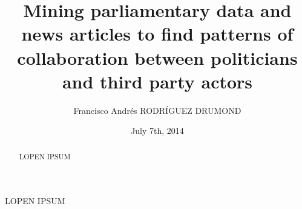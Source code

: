 \documentclass{report-DMKM}
\title{Mining parliamentary data and news articles \newline to find patterns of collaboration between politicians and third party actors}
\author{Francisco Andr\'es RODR\'IGUEZ DRUMOND}
\date{July 7th, 2014}
\begin{document}
\maketitle

\newpage
\begin{abstract}
LOPEN IPSUM
\end{abstract}

\begin{resume}
LOPEN IPSUM
\end{resume}

\tabledesmatieres


\newpage

\newpage

\newpage

\newpage

\newpage

\newpage

\newpage

\newpage


 
\appendixECD
\end{document}
